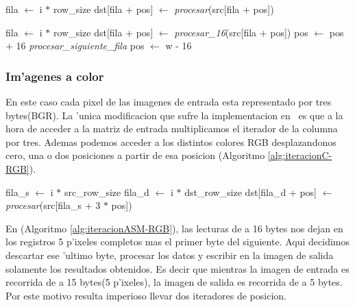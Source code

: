 \begin{algorithm}[h!]
\caption{}\label{alg:iteracionC-BN}
\begin{algorithmic}[1]
	\STATE fila $\leftarrow$ i $*$ row\_size
		\STATE dst[fila + pos] $\leftarrow$ \textit{procesar}(src[fila + pos])
	\ENDFOR
\ENDFOR
\end{algorithmic}
\end{algorithm}

\begin{algorithm}[h!]
\caption{}\label{alg:iteracionASM-BN}
\begin{algorithmic}[1]
	\STATE fila $\leftarrow$ i $*$ row\_size
		\STATE dst[fila + pos] $\leftarrow$ \textit{procesar_{16}}(src[fila + pos])
		\STATE pos $\leftarrow$ pos + 16		
			\STATE \textit{procesar\_siguiente\_fila}
			\STATE pos $\leftarrow$ w - 16
		\ENDIF
		
	\ENDFOR
\ENDFOR
\end{algorithmic}
\end{algorithm}

\subsubsection{Im'agenes a color}
En este caso cada pixel de las imagenes de entrada esta representado por tres bytes(BGR). La 'unica modificacion que sufre la implementacion en \C\ es que a la hora de acceder a la matriz de entrada multiplicamos el iterador de la columna por tres. Ademas podemos acceder a los distintos colores RGB desplazandonos cero, una o dos posiciones a partir de esa posicion (Algoritmo \ref{alg:iteracionC-RGB}).


\begin{algorithm}[h!]
\caption{}\label{alg:iteracionC-RGB}
\begin{algorithmic}[1]
	\STATE fila_s $\leftarrow$ i $*$ src\_row\_size	
	\STATE fila_d $\leftarrow$ i $*$ dst\_row\_size
		\STATE dst[fila_d + pos] $\leftarrow$ \textit{procesar}(src[fila_s + 3 $*$ pos])
	\ENDFOR
\ENDFOR
\end{algorithmic}
\end{algorithm}

En \ass (Algoritmo \ref{alg:iteracionASM-RGB}), las lecturas de a 16 bytes nos dejan en los registros 5 p'ixeles completos mas el primer byte del siguiente. Aqui decidimos descartar ese 'ultimo byte, procesar los datos y escribir en la imagen de salida solamente los resultados obtenidos. Es decir que mientras la imagen de entrada es recorrida de a 15 bytes(5 p'ixeles), la imagen de salida es recorrida de a 5 bytes. Por este motivo resulta imperioso llevar dos iteradores de posicion.

